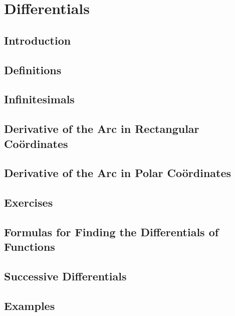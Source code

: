 \chapter{Differentials}
\label{ch:09}

\section{Introduction}
\label{sec:09:01}

\section{Definitions}
\label{sec:09:02}

\section{Infinitesimals}
\label{sec:09:03}

\section{Derivative of the Arc in Rectangular Co\"ordinates}
\label{sec:09:04}

\section{Derivative of the Arc in Polar Co\"ordinates}
\label{sec:09:05}

\section{Exercises}
\label{sec:09:06}

\section{Formulas for Finding the Differentials of Functions}
\label{sec:09:07}

\section{Successive Differentials}
\label{sec:09:08}

\section{Examples}
\label{sec:09:09}

